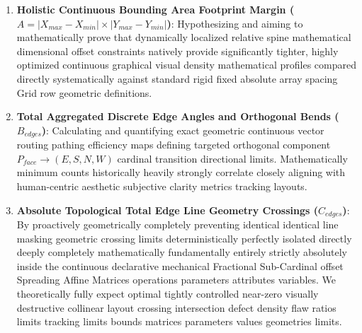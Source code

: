 \documentclass[fleqn,10pt]{wlscirep}
\begin{document}
\begin{enumerate}
    \item \textbf{Holistic Continuous Bounding Area Footprint Margin ($A = |X_{max} - X_{min}| \times |Y_{max} - Y_{min}|$)}: Hypothesizing and aiming to mathematically prove that dynamically localized relative spine mathematical dimensional offset constraints natively provide significantly tighter, highly optimized continuous graphical visual density mathematical profiles compared directly systematically against standard rigid fixed absolute array spacing Grid row geometric definitions.
    
    \item \textbf{Total Aggregated Discrete Edge Angles and Orthogonal Bends ($B_{edges}$)}: Calculating and quantifying exact geometric continuous vector routing pathing efficiency maps defining targeted orthogonal component $P_{face} \to (E, S, N, W)$ cardinal transition directional limits. Mathematically minimum counts historically heavily strongly correlate closely aligning with human-centric aesthetic subjective clarity metrics tracking layouts.
    
    \item \textbf{Absolute Topological Total Edge Line Geometry Crossings ($C_{edges}$)}: By proactively geometrically completely preventing identical identical line masking geometric crossing limits deterministically perfectly isolated directly deeply completely mathematically fundamentally entirely strictly absolutely inside the continuous declarative mechanical Fractional Sub-Cardinal offset Spreading Affine Matrices operations parameters attributes variables. We theoretically fully expect optimal tightly controlled near-zero visually destructive collinear layout crossing intersection defect density flaw ratios limits tracking limits bounds matrices parameters values geometries limits.
    

\end{enumerate}
\end{document}
